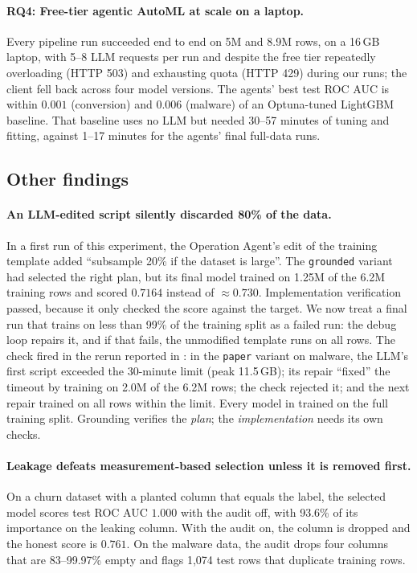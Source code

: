 \paragraph{RQ4: Free-tier agentic AutoML at scale on a laptop.} Every pipeline run succeeded end to end on 5M and 8.9M rows, on a 16\,GB laptop, with 5--8 LLM requests per run and despite the free tier repeatedly overloading (HTTP 503) and exhausting quota (HTTP 429) during our runs; the client fell back across four model versions. The agents' best test ROC AUC is within $0.001$ (conversion) and $0.006$ (malware) of an Optuna-tuned LightGBM baseline. That baseline uses no LLM but needed 30--57 minutes of tuning and fitting, against 1--17 minutes for the agents' final full-data runs.

\subsection{Other findings}
\label{sec:results-other}

\paragraph{An LLM-edited script silently discarded 80\% of the data.} In a first run of this experiment, the Operation Agent's edit of the training template added ``subsample 20\% if the dataset is large''. The \texttt{grounded} variant had selected the right plan, but its final model trained on 1.25M of the 6.2M training rows and scored $0.7164$ instead of $\approx 0.730$. Implementation verification passed, because it only checked the score against the target. We now treat a final run that trains on less than 99\% of the training split as a failed run: the debug loop repairs it, and if that fails, the unmodified template runs on all rows. The check fired in the rerun reported in : in the \texttt{paper} variant on malware, the LLM's first script exceeded the 30-minute limit (peak 11.5\,GB); its repair ``fixed'' the timeout by training on 2.0M of the 6.2M rows; the check rejected it; and the next repair trained on all rows within the limit. Every model in  trained on the full training split. Grounding verifies the \emph{plan}; the \emph{implementation} needs its own checks.

\paragraph{Leakage defeats measurement-based selection unless it is removed first.} On a churn dataset with a planted column that equals the label, the selected model scores test ROC AUC $1.000$ with the audit off, with 93.6\% of its importance on the leaking column. With the audit on, the column is dropped and the honest score is $0.761$. On the malware data, the audit drops four columns that are 83--99.97\% empty and flags 1{,}074 test rows that duplicate training rows.

